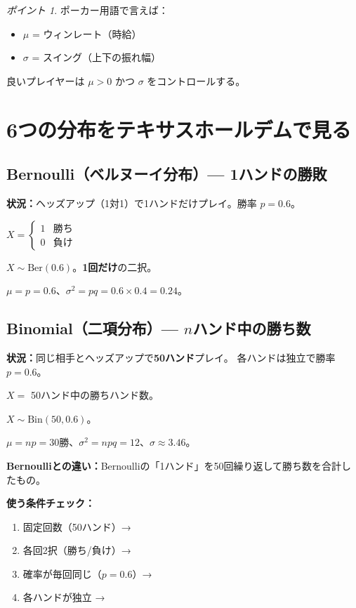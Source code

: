 \documentclass{article}
\theoremstyle{remark}
\newtheorem*{point}{ポイント}
\begin{document}
\begin{point}
  ポーカー用語で言えば：
  \begin{itemize}
    \item $\mu$ = ウィンレート（時給）
    \item $\sigma$ = スイング（上下の振れ幅）
  \end{itemize}
  良いプレイヤーは $\mu > 0$ かつ $\sigma$ をコントロールする。
\end{point}

\section{6つの分布をテキサスホールデムで見る}

\subsection{Bernoulli（ベルヌーイ分布）--- 1ハンドの勝敗}

\textbf{状況：}ヘッズアップ（1対1）で1ハンドだけプレイ。勝率 $p = 0.6$。

$X = \begin{cases} 1 & \text{勝ち} \\ 0 & \text{負け} \end{cases}$

$X \sim \text{Ber}(0.6)$。\textbf{1回だけ}の二択。

$\mu = p = 0.6$、$\sigma^2 = pq = 0.6 \times 0.4 = 0.24$。

\subsection{Binomial（二項分布）--- $n$ハンド中の勝ち数}

\textbf{状況：}同じ相手とヘッズアップで\textbf{50ハンド}プレイ。
各ハンドは独立で勝率 $p = 0.6$。

$X = $ 50ハンド中の勝ちハンド数。

$X \sim \text{Bin}(50, 0.6)$。

$\mu = np = 30$勝、$\sigma^2 = npq = 12$、$\sigma \approx 3.46$。

\textbf{Bernoulliとの違い：}Bernoulliの「1ハンド」を50回繰り返して勝ち数を合計したもの。

\medskip
\textbf{使う条件チェック：}
\begin{enumerate}
  \item 固定回数（50ハンド）→ \checkmark
  \item 各回2択（勝ち/負け）→ \checkmark
  \item 確率が毎回同じ（$p=0.6$）→ \checkmark
  \item 各ハンドが独立 → \checkmark
\end{enumerate}
\end{document}
